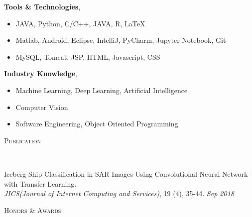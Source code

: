 \documentclass[10pt]{article}
\newenvironment{changemargin}[2]{
  \begin{list}{}{
    \setlength{\topsep}{0pt}
    \setlength{\leftmargin}{#1}
    \setlength{\rightmargin}{#2}
    \setlength{\listparindent}{\parindent}
    \setlength{\itemindent}{\parindent}
    \setlength{\parsep}{\parskip}
  }
  \item[]}{\end{list}
}
\newcommand{\lineover}{
	\begin{changemargin}{-0.05in}{-0.05in}
		\vspace*{-8pt}
		\hrulefill \\
		\vspace*{-2pt}
	\end{changemargin}
}
\newcommand{\header}[1]{
	\begin{changemargin}{-0.5in}{-0.5in}
		\scshape{#1}\\
  	\lineover
	\end{changemargin}
}
\newcommand{\labdescription}[1]{
	\begin{changemargin}{0.15in}{0.15in}
    \smallskip
		{#1}
    \medskip
	\end{changemargin}
}
\newcommand{\labtitle}[3]{
	\textbf{#1}, \emph{#2} \hfill \emph{#3}\\
}
\newcommand{\presentation}[2]{
	{#1} \hfill \emph{#2}\\ \bigskip
}
\newenvironment{body} {
	\vspace*{-16pt}
	\begin{changemargin}{-0.25in}{-0.5in}
  }
	{\end{changemargin}
}
\begin{document}
\begin{body}
	\vspace{14pt}

  	\labtitle{Tools \& Technologies}{}{}
  \labdescription {
  	\begin{itemize} \itemsep -0pt  %
      \item JAVA, Python, C/C++, JAVA, R, LaTeX
      \item Matlab, Android, Eclipse, IntelliJ, PyCharm, Jupyter Notebook, Git
      \item MySQL, Tomcat, JSP, HTML, Javascript, CSS
  	\end{itemize}
  }
  
  	\labtitle{Industry Knowledge}{}{}
  \labdescription {
  	\begin{itemize} \itemsep -0pt  %
      \item Machine Learning, Deep Learning, Artificial Intelligence
      \item Computer Vision
      \item Software Engineering, Object Oriented Programming
  	\end{itemize}
  }

\end{body}

\medskip


\header{Publication}

\begin{body}
	\vspace{14pt}

\presentation{Iceberg-Ship Classification in SAR Images Using Convolutional Neural Network with Transfer Learning.\\ \emph{JICS(Journal of Internet Computing and Services)}, 19 (4), 35-44.}{Sep 2018}

\end{body}

\medskip


\header{Honors \& Awards}
\end{document}
